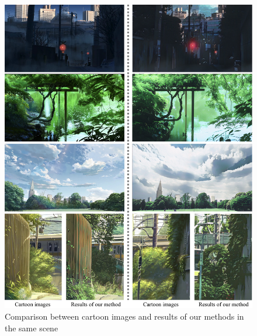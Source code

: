 \documentclass[10pt,twocolumn,letterpaper]{article}
\begin{document}
\begin{figure}[htb]
\centering
\includegraphics[width=\linewidth]{figures/compare.pdf}
\caption{Comparison between cartoon images and results of our methods in the same scene}
\label{fig:compare1}
\end{figure}
\end{document}
